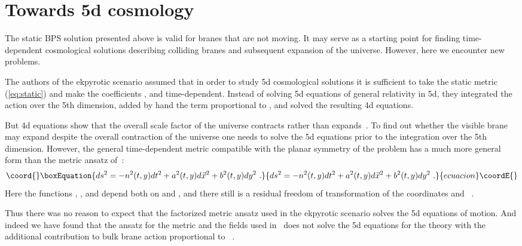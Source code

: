 \documentclass[a4paper,12pt]{article}
\begin{document}
  
  
\section{Towards 5d cosmology}

The static BPS solution presented above is valid for branes that are not moving. It  may serve as a starting point for finding time-dependent cosmological   
solutions describing colliding branes and subsequent expansion of the universe.   However, here we encounter new problems.

The authors of the ekpyrotic scenario assumed that in order to study 5d cosmological solutions it is sufficient to take the static metric (\ref{eq:static}) and make the coefficients \coordHE{}, \coordHE{} and \coordHE{} time-dependent. Instead of solving 5d equations of general relativity in 5d, they integrated the action over the 5th dimension, added by hand the term proportional to \coordHE{}, and solved the resulting 4d equations.

But 4d equations show that the overall scale factor of the universe contracts rather than expands~\cite{KOST,KKLT}. To find out whether the visible brane may expand despite the overall contraction of the universe one  needs to solve the 5d equations prior to the integration over the 5th dimension. However, the general time-dependent  metric compatible with the planar symmetry of the problem  has a much more general form than the metric ansatz of~\cite{KOST}:
\begin{equation}\coord{}\boxEquation{\label{gener}   
ds^2= -n^2(t,y)dt^2+a^2(t,y)d{\vec x}^2+b^2(t,y)dy^2 \ .   
}{ds^2= -n^2(t,y)dt^2+a^2(t,y)d{\vec x}^2+b^2(t,y)dy^2 \ .   
}{ecuacion}\coordE{}\end{equation}   
Here the functions \coordHE{}, \coordHE{}, and \coordHE{} depend both on \coordHE{} and \coordHE{}, and there still is a residual freedom of transformation of the coordinates \coordHE{} and \coordHE{}~\cite{Binetruy:2000ut}.
 
Thus there was no reason to expect that the factorized  metric ansatz used in the ekpyrotic scenario solves the 5d equations of motion. And indeed we have found that 
 the ansatz for the metric and the fields used in~\cite{KOST} does not solve the 5d equations for the theory with the additional contribution to  bulk brane action proportional to \coordHE{}~\cite{KKLT}. 
 
\end{document}
